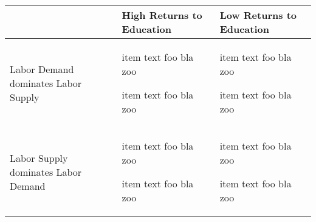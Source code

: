 \documentclass{article}
\begin{document}
\begin{table}[htbp!]
\centering
\renewcommand{\arraystretch}{1.5}
\setlength{\tabcolsep}{1em} %
\begin{tabularx}{\textwidth}{|p{30mm}|X@{}|X@{}|}
\hline
  & High Returns to Education &  Low Returns to Education \\ \hline 
Labor Demand dominates Labor Supply
&
\begin{tabitemize}
\item item text foo bla zoo
\item item text foo bla zoo
\end{tabitemize}
&
\begin{tabitemize}
\item item text foo bla zoo
\item item text foo bla zoo
\end{tabitemize} \\ \hline
Labor Supply dominates Labor Demand
&
\begin{tabitemize}
\item item text foo bla zoo
\item item text foo bla zoo
\end{tabitemize}
&
\begin{tabitemize}
\item item text foo bla zoo
\item item text foo bla zoo
\end{tabitemize} \\ \hline
\end{tabularx}
\end{table}
\end{document}

